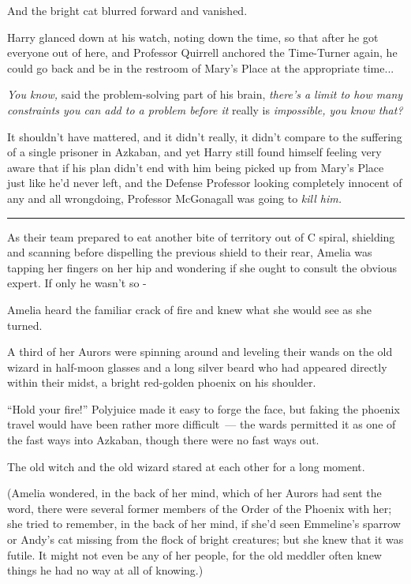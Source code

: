 And the bright cat blurred forward and vanished.

Harry glanced down at his watch, noting down the time, so that after he got everyone out of here, and Professor Quirrell anchored the Time-Turner again, he could go back and be in the restroom of Mary's Place at the appropriate time...

\emph{You know,} said the problem-solving part of his brain, \emph{there's a limit to how many constraints you can add to a problem before it} really is \emph{impossible, you know that?}

It shouldn't have mattered, and it didn't really, it didn't compare to the suffering of a single prisoner in Azkaban, and yet Harry still found himself feeling very aware that if his plan didn't end with him being picked up from Mary's Place just like he'd never left, and the Defense Professor looking completely innocent of any and all wrongdoing, Professor McGonagall was going to \emph{kill him.}

\begin{center}\rule{3in}{0.4pt}\end{center}

As their team prepared to eat another bite of territory out of C spiral, shielding and scanning before dispelling the previous shield to their rear, Amelia was tapping her fingers on her hip and wondering if she ought to consult the obvious expert. If only he wasn't so -

Amelia heard the familiar crack of fire and knew what she would see as she turned.

A third of her Aurors were spinning around and leveling their wands on the old wizard in half-moon glasses and a long silver beard who had appeared directly within their midst, a bright red-golden phoenix on his shoulder.

``Hold your fire!'' Polyjuice made it easy to forge the face, but faking the phoenix travel would have been rather more difficult~--- the wards permitted it as one of the fast ways into Azkaban, though there were no fast ways out.

The old witch and the old wizard stared at each other for a long moment.

(Amelia wondered, in the back of her mind, which of her Aurors had sent the word, there were several former members of the Order of the Phoenix with her; she tried to remember, in the back of her mind, if she'd seen Emmeline's sparrow or Andy's cat missing from the flock of bright creatures; but she knew that it was futile. It might not even be any of her people, for the old meddler often knew things he had no way at all of knowing.)

